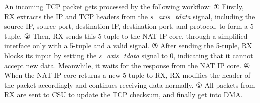     An incoming TCP packet gets processed by the following workflow:
    ① Firstly, RX extracts the IP and TCP headers from the \emph{s\_axis\_tdata} signal, including the source IP, source port, destination IP, destination port, and protocol, to form a 5-tuple.
    ② Then, RX sends this 5-tuple to the NAT IP core, through a simplified interface only with a 5-tuple and a valid signal.
    ③ After sending the 5-tuple, RX blocks its input by setting the \emph{s\_axis\_tdata} signal to 0, indicating that it cannot accept new data. Meanwhile, it waits for the response from the NAT IP core.
    ④ When the NAT IP core returns a new 5-tuple to RX, RX modifies the header of the packet accordingly and continues receiving data normally.
    ⑤ All packets from RX are sent to CSU to update the TCP checksum, and finally get into DMA. 
